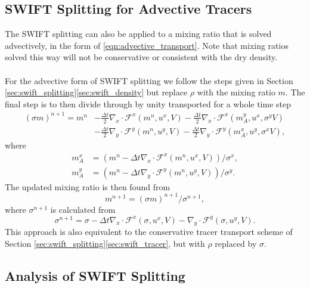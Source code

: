 \documentclass{ametsocV6.1}
\begin{document}
\subsection{SWIFT Splitting for Advective Tracers}

The SWIFT splitting can also be applied to a mixing ratio that is solved advectively, in the form of \eqref{eqn:advective_transport}. Note that mixing ratios solved this way will not be conservative or consistent with the dry density. \\ 
\\
For the advective form of SWIFT splitting we follow the steps given in Section \ref{sec:swift_splitting}\ref{sec:swift_density} but replace $\rho$ with the mixing ratio $m$. The final step is to then divide through by unity transported for a whole time step
\begin{equation}
\begin{split}
(\sigma m)^{n+1} = m^{n} & - \frac{\Delta{t}}{2}\nabla_x\cdot \mathcal{F}^x(m^n, u^x, V) - \frac{\Delta{t}}{2}\nabla_x\cdot \mathcal{F}^x(m^y_A, u^x, \sigma^yV) \\
& - \frac{\Delta{t}}{2}\nabla_y\cdot \mathcal{F}^y(m^n, u^y, V) - \frac{\Delta{t}}{2}\nabla_y\cdot \mathcal{F}^y(m^x_A, u^y, \sigma^xV),
\end{split}
\end{equation}
where
\begin{align}
    m^x_A &= (m^n - \Delta{t} \nabla_x\cdot \mathcal{F}^x(m^n, u^x, V)) / \sigma^x, \\
    m^y_A &= (m^n - \Delta{t} \nabla_y\cdot \mathcal{F}^y(m^n, u^y, V)) / \sigma^y.
\end{align}
The updated mixing ratio is then found from
\begin{equation}
m^{n+1} = (\sigma m)^{n+1}/\sigma^{n+1},
\end{equation}
where $\sigma^{n+1}$ is calculated from
\begin{equation}
\sigma^{n+1} = \sigma - \Delta{t} \nabla_x\cdot \mathcal{F}^x(\sigma, u^x, V) -  \nabla_y \cdot \mathcal{F}^y(\sigma, u^y, V).
\end{equation}
This approach is also equivalent to the conservative tracer transport scheme of Section \ref{sec:swift_splitting}\ref{sec:swift_tracer}, but with $\rho$ replaced by $\sigma$.

\subsection{Analysis of SWIFT Splitting}
\end{document}

